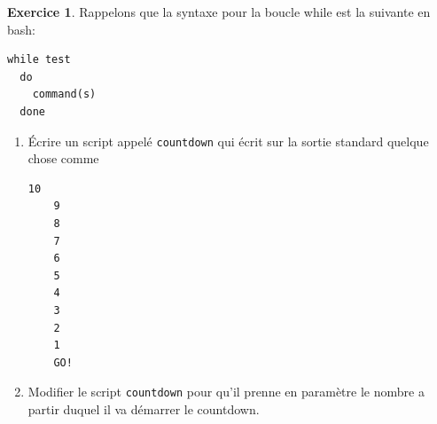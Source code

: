 \documentclass[a4paper,11pt]{article}
\theoremstyle{plain}
\theoremstyle{definition}
\newtheorem{exercice}{Exercice}
\begin{document}

\begin{exercice}
Rappelons que la syntaxe pour la boucle while est la suivante en bash:
\begin{lstlisting}[numbers=none]
  while test
  do
    command(s)
  done
\end{lstlisting}
\begin{enumerate}
\item
\'Ecrire un script appelé \texttt{countdown} qui écrit sur la sortie standard quelque chose comme
\begin{lstlisting}[numbers=none,language={}]
    10
    9
    8
    7
    6
    5
    4
    3
    2
    1
    GO!
\end{lstlisting}
\item Modifier le script \texttt{countdown} pour qu'il prenne en paramètre le nombre a partir duquel il va démarrer le countdown.
\end{enumerate}
\end{exercice}
\end{document}
